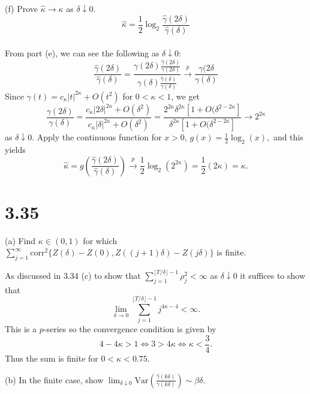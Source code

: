 \documentclass{article}
\begin{document}
\noindent
(f) Prove $\hat{\kappa} \to \kappa$ as $\delta \downarrow 0$. $$\hat{\kappa} = \frac{1}{2} \log_2 \frac{\hat{\gamma}(2\delta)}{\hat{\gamma}(\delta)}$$ \\
From part (e), we can see the following as $\delta\downarrow 0$: 
$$\frac{\hat{\gamma}(2\delta)}{\hat{\gamma}(\delta)}=\frac{\gamma(2\delta)\frac{\hat{\gamma}(2\delta)}{\gamma(2\delta)}}{\gamma(\delta)\frac{\hat{\gamma}(\delta)}{\gamma(\delta)}}\xrightarrow{p} \frac{\gamma(2\delta}{\gamma(\delta)}$$
Since $\gamma(t) = c_{\kappa} |t|^{2\kappa} +O(t^2)$ for $0<\kappa<1$, we get
$$\frac{\gamma(2\delta)}{\gamma(\delta)}=\frac{c_{\kappa} |2\delta|^{2\kappa} +O(\delta^2)}{c_{\kappa} |\delta|^{2\kappa} +O(\delta^2)}=\frac{2^{2\kappa}\delta^{2\kappa}[1+O(\delta^{2-2\kappa}]}{\delta^{2\kappa}[1+O(\delta^{2-2\kappa}]}\to 2^{2\kappa}$$
as $\delta\downarrow0$. Apply the continuous function for $x>0$, $g(x) = \frac{1}{2}\log_2(x),$ and this yields
$$\hat{\kappa} =g\left(\frac{\hat{\gamma}(2\delta)}{\hat{\gamma}(\delta)} \right)\xrightarrow{p} \frac{1}{2} \log_2 (2^{2\kappa})=\frac{1}{2}(2\kappa)=\kappa.$$ 


\section*{3.35}
(a) Find $\kappa \in (0, 1)$ for which $\sum_{j=1}^{\infty} \text{corr}^2\{Z(\delta) - Z(0), Z((j+1)\delta) - Z(j\delta)\}$ is finite.

As discussed in 3.34 (c) to show that $\sum_{j=1}^{\lfloor T/\delta \rfloor - 1}\rho_{j}^2 < \infty$ as $\delta\downarrow 0$ it suffices to show that 
 $$\lim_{\delta \to 0}  \sum_{j=1}^{\lfloor T/\delta\rfloor-1} j^{4\kappa-4} <\infty.$$
 This is a $p$-series so the convergence condition is given by 
 $$4 - 4\kappa > 1 \iff 3 > 4\kappa \iff \kappa < \frac{3}{4}.$$
\noindent
Thus the sum is finite for $0 < \kappa < 0.75$.
\medskip

\noindent
(b) In the finite case, show $\lim_{\delta \downarrow 0}\text{Var}\left(\frac{\hat{\gamma}(k\delta)}{\gamma(k\delta)}\right) \sim \beta \delta$.
\end{document}
